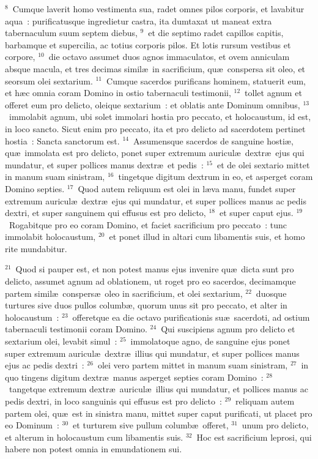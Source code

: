 ${}^{8}$~Cumque laverit homo vestimenta sua, radet omnes pilos corporis, et lavabitur aqua~: purificatusque ingredietur castra, ita dumtaxat ut maneat extra tabernaculum suum septem diebus,
${}^{9}$~et die septimo radet capillos capitis, barbamque et supercilia, ac totius corporis pilos. Et lotis rursum vestibus et corpore,
${}^{10}$~die octavo assumet duos agnos immaculatos, et ovem anniculam absque macula, et tres decimas simil\ae\ in sacrificium, qu\ae\ conspersa sit oleo, et seorsum olei sextarium.
${}^{11}$~Cumque sacerdos purificans hominem, statuerit eum, et h\ae c omnia coram Domino in ostio tabernaculi testimonii,
${}^{12}$~tollet agnum et offeret eum pro delicto, oleique sextarium~: et oblatis ante Dominum omnibus,
${}^{13}$~immolabit agnum, ubi solet immolari hostia pro peccato, et holocaustum, id est, in loco sancto. Sicut enim pro peccato, ita et pro delicto ad sacerdotem pertinet hostia~: Sancta sanctorum est.
${}^{14}$~Assumensque sacerdos de sanguine hosti\ae , qu\ae\ immolata est pro delicto, ponet super extremum auricul\ae\ dextr\ae\ ejus qui mundatur, et super pollices manus dextr\ae\ et pedis~:
${}^{15}$~et de olei sextario mittet in manum suam sinistram,
${}^{16}$~tingetque digitum dextrum in eo, et asperget coram Domino septies.
${}^{17}$~Quod autem reliquum est olei in l\ae va manu, fundet super extremum auricul\ae\ dextr\ae\ ejus qui mundatur, et super pollices manus ac pedis dextri, et super sanguinem qui effusus est pro delicto,
${}^{18}$~et super caput ejus.
${}^{19}$~Rogabitque pro eo coram Domino, et faciet sacrificium pro peccato~: tunc immolabit holocaustum,
${}^{20}$~et ponet illud in altari cum libamentis suis, et homo rite mundabitur.


${}^{21}$~Quod si pauper est, et non potest manus ejus invenire qu\ae\ dicta sunt pro delicto, assumet agnum ad oblationem, ut roget pro eo sacerdos, decimamque partem simil\ae\ conspers\ae\ oleo in sacrificium, et olei sextarium,
${}^{22}$~duosque turtures sive duos pullos columb\ae , quorum unus sit pro peccato, et alter in holocaustum~:
${}^{23}$~offeretque ea die octavo purificationis su\ae\ sacerdoti, ad ostium tabernaculi testimonii coram Domino.
${}^{24}$~Qui suscipiens agnum pro delicto et sextarium olei, levabit simul~:
${}^{25}$~immolatoque agno, de sanguine ejus ponet super extremum auricul\ae\ dextr\ae\ illius qui mundatur, et super pollices manus ejus ac pedis dextri~:
${}^{26}$~olei vero partem mittet in manum suam sinistram,
${}^{27}$~in quo tingens digitum dextr\ae\ manus asperget septies coram Domino~:
${}^{28}$~tangetque extremum dextr\ae\ auricul\ae\ illius qui mundatur, et pollices manus ac pedis dextri, in loco sanguinis qui effusus est pro delicto~:
${}^{29}$~reliquam autem partem olei, qu\ae\ est in sinistra manu, mittet super caput purificati, ut placet pro eo Dominum~:
${}^{30}$~et turturem sive pullum columb\ae\ offeret,
${}^{31}$~unum pro delicto, et alterum in holocaustum cum libamentis suis.
${}^{32}$~Hoc est sacrificium leprosi, qui habere non potest omnia in emundationem sui.


